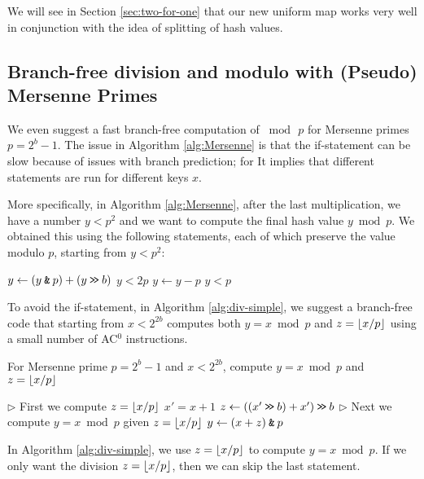 We will see in Section \ref{sec:two-for-one} that our new uniform map
works very well in conjunction with the idea of splitting of hash values.




\subsection{Branch-free division and modulo with (Pseudo) Mersenne Primes}\label{subsec:intro-division}
%
We even suggest a fast branch-free computation of $\bmod\,p$ for
Mersenne primes $p=2^b-1$. The issue in Algorithm \ref{alg:Mersenne}
is that the if-statement can be slow because of issues with branch
prediction; for It implies that different statements are run for
different keys $x$.

More specifically, in Algorithm \ref{alg:Mersenne}, after the last
multiplication, we have a number $y<p^2$ and we want to compute the
final hash value $y\bmod p$. We obtained this using the following
statements, each of which preserve the value modulo $p$, starting from
$y<p^2$:
\begin{algorithmic}
   \State $y \gets (y\mathbin{\texttt{\&}} p)+(y\mathbin{\texttt{>\!>}} b)$
   \Comment $y<2p$
   \State $y\gets y-p$
   \Comment  $y<p$
   \EndIf
\end{algorithmic}
To avoid the if-statement, in Algorithm \ref{alg:div-simple}, we suggest
a branch-free code that starting
from $x<2^{2b}$ computes both $y=x\bmod p$ and $z=\lfloor {x/p} \rfloor$ using
a small number of AC$^0$ instructions. 
\begin{algorithm}[H]
   \caption{For Mersenne prime $p=2^b-1$ and $x< 2^{2b}$, compute
   \label{alg:div-simple}
   $y=x\bmod p$ and $z=\lfloor {x/p} \rfloor$}
   \begin{algorithmic}
      \State $\rhd$ First we compute $z=\lfloor {x/p} \rfloor$
      \State $x'=x+1$
      \State $z \gets(( x' \mathbin{\texttt{>\!>}} b)+x')\mathbin{\texttt{>\!>}} b$
      \State $\rhd$ Next we compute $y=x\bmod p$ given $z=\lfloor {x/p} \rfloor$
      \State $y \gets (x + z) \mathbin{\texttt{\&}} p $
   \end{algorithmic}
\end{algorithm}
In Algorithm \ref{alg:div-simple}, we use
$z=\lfloor {x/p} \rfloor$ to compute $y=x\bmod p$. If we only want the
division $z=\lfloor {x/p} \rfloor$, then we can skip the last statement.

